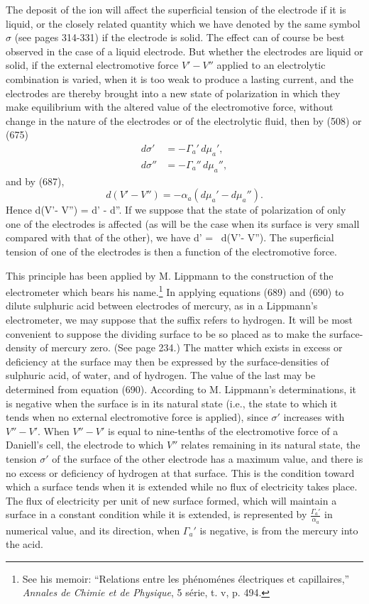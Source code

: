 \documentclass[12pt]{article}
\begin{document}
The deposit of the ion will affect the superficial tension of the electrode if it is liquid, or the closely related quantity which we have denoted by the same symbol $\sigma$ (see pages 314-331) if the electrode is solid. The effect can of course be best observed in the case of a liquid  electrode. But whether the electrodes are liquid or solid, if the external electromotive force $V'- V''$ applied to an electrolytic combination is varied, when it is too weak to produce a lasting current, and the electrodes are thereby brought into a new state of polarization in which they make equilibrium with the altered value of the electromotive force, without change in the nature of the electrodes or of the electrolytic fluid, then by (508) or (675)
\begin{align*}
d\sigma' &= - \Gamma_a'\,d\mu_a', \\
d\sigma'' &= - \Gamma_a''\,d\mu_a'',\end{align*}
and by (687),
$$ d( V'- V'') =-\alpha_a(d\mu_a'-d\mu_a'').$$
Hence
\eqs d(V'- V'') =  d\sigma' -  d\sigma''.   \label{689} \eqe
If we suppose that the state of polarization of only one of the electrodes is affected (as will be the case when its surface is very small compared with that of the other), we have
\eqs d\sigma' =   \, d(V'- V'').   \label{690} \eqe
The superficial tension of one of the electrodes is then a function of the electromotive force.

This principle has been applied by M. Lippmann to the construction of the electrometer which bears his name.\footnote{See his memoir: ``Relations entre les ph\'{e}nom\'{e}nes \'{e}lectriques et capillaires,'' \textit{Annales de Chimie et de Physique}, 5 s\'{e}rie, t. v, p. 494.} In applying equations (689) and (690) to dilute sulphuric acid between electrodes of mercury, as in a Lippmann's electrometer, we may suppose that the suffix refers to hydrogen. It will be most convenient to suppose the dividing surface to be so placed as to make the surface-density of mercury zero. (See page 234.) The matter which exists in excess or deficiency at the surface may then be expressed by the surface-densities of sulphuric acid, of water, and of hydrogen. The value of the last may be determined from equation (690). According to M. Lippmann's determinations, it is negative when the surface is in its natural state (i.e., the state to which it tends when no external electromotive force is applied), since $\sigma'$ increases with $V''- V'$. When $V''- V'$ is equal to nine-tenths of the electromotive force of a Daniell's cell, the electrode to which $V''$ relates remaining in its natural state, the tension $\sigma'$ of the surface of the other electrode has a maximum value, and there is no excess or deficiency of hydrogen at that surface. This is the condition toward which a surface tends when it is extended while no flux of electricity takes place. The flux of electricity per unit of new surface formed, which will maintain a surface in a constant condition while it is extended, is represented by $\frac{\Gamma_a'}{\alpha_a}$ in numerical value, and its direction, when $\Gamma_a'$ is negative, is from the mercury into the acid.
\end{document}
